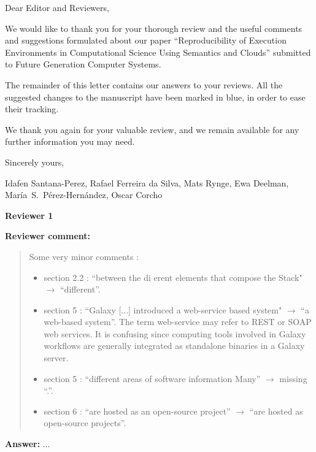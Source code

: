 \documentclass{letter}
\date{Nov XX, 2015}
\newenvironment{review}%
{\textbf{Reviewer comment:}\begin{quote}}%
{\end{quote}}%
\newcommand{\answer}[1]{%
      \textbf{Answer:} #1}
\newcommand{\revised}[1]{\emph{#1}\color{black}}
\begin{document}
\begin{letter}{}

\opening{Dear Editor and Reviewers,}

We would like to thank you for your thorough review and the useful
comments and suggestions formulated about our paper 
``Reproducibility of Execution Environments in Computational Science Using Semantics and Clouds'' 
submitted to Future Generation Computer Systems.

The remainder of this letter contains our answers to your reviews. All the suggested changes to the manuscript have been marked in blue, in order to ease their tracking.

We thank you again for your valuable review, and we remain available for any further information you may need.

\vspace{0.5cm}

Sincerely yours,

\vspace{1cm}

Idafen Santana-Perez, Rafael Ferreira da Silva, Mats Rynge, Ewa Deelman, Mar\'ia~S.~P\'erez-Hern\'andez, Oscar Corcho

\newpage


%
%
\textbf{Reviewer 1}

\begin{review}
Some very minor comments :
\begin{itemize}
        \item section 2.2 : ``between the di  erent elements that compose the Stack" $\rightarrow$ ``different''.
        \item section 5 : ``Galaxy [...] introduced a web-service based system" $\rightarrow$ ``a web-based system''. The term web-service may refer to REST or SOAP web services. It is confusing since computing tools involved in Galaxy workflows are generally integrated as standalone binaries in a Galaxy server.
        \item section 5 : ``different areas of software information Many'' $\rightarrow$ missing ``.''.
        \item section 6 : ``are hosted as an open-source project'' $\rightarrow$ ``are hosted as open-source projects''.
        \end{itemize}
\end{review}

\answer{...}









\end{letter}
\end{document}

